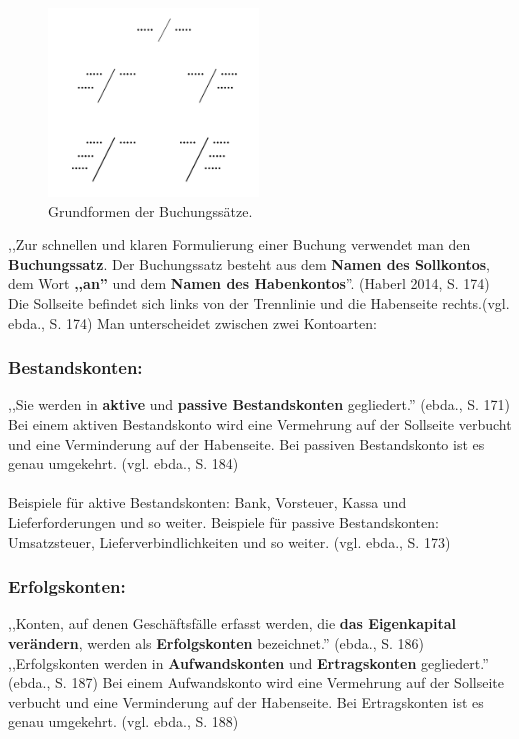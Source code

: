 \documentclass[12pt]{report}
\begin{document}
\begin{figure}[h]
	\centering
	\includegraphics[height=5cm]{images/bs_types}
	\caption[Buchungssatzarten]{Grundformen der Buchungssätze.}
\end{figure}
  
\noindent ,,Zur schnellen und klaren Formulierung einer Buchung verwendet man den \textbf{Buchungssatz}. Der Buchungssatz besteht aus dem \textbf{Namen des Sollkontos}, dem Wort \textbf{,,an''} und dem \textbf{Namen des Habenkontos}''. (Haberl 2014, S. 174\nocite{RW1}) Die Sollseite befindet sich links von der Trennlinie und die Habenseite rechts.(vgl. ebda., S. 174\nocite{RW1}) Man unterscheidet zwischen zwei Kontoarten: \\

\subsubsection{Bestandskonten:}
,,Sie werden in \textbf{aktive} und \textbf{passive Bestandskonten} gegliedert.'' (ebda., S. 171\nocite{RW1}) Bei einem aktiven Bestandskonto wird eine Vermehrung auf der Sollseite verbucht und eine Verminderung auf der Habenseite. Bei passiven Bestandskonto ist es genau umgekehrt. (vgl. ebda., S. 184\nocite{RW1}) \\\\
Beispiele für aktive Bestandskonten: Bank, Vorsteuer, Kassa und Lieferforderungen und so weiter.
Beispiele für passive Bestandskonten: Umsatzsteuer, Lieferverbindlichkeiten und so weiter. (vgl. ebda., S. 173\nocite{RW1})

\subsubsection{Erfolgskonten:}
,,Konten, auf denen Geschäftsfälle erfasst werden, die \textbf{das Eigenkapital verändern}, werden als \textbf{Erfolgskonten} bezeichnet.'' (ebda., S. 186\nocite{RW1})
,,Erfolgskonten werden in \textbf{Aufwandskonten} und \textbf{Ertragskonten} gegliedert.'' (ebda., S. 187\nocite{RW1})
Bei einem Aufwandskonto wird eine Vermehrung auf der Sollseite verbucht und eine Verminderung auf der Habenseite. Bei Ertragskonten ist es genau umgekehrt. (vgl. ebda., S. 188\nocite{RW1})
\end{document}
